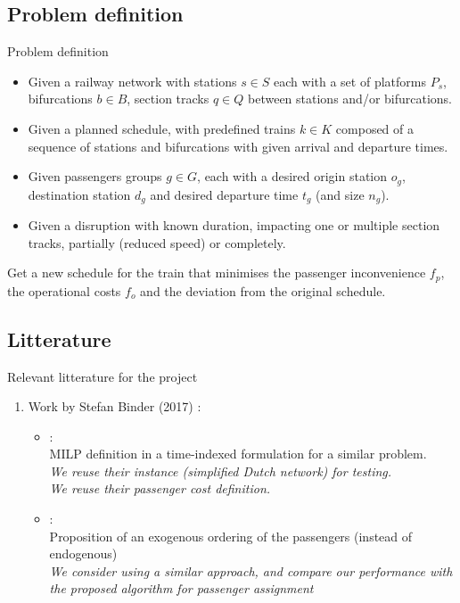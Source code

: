 \documentclass{EESD}
\begin{document}
\subsection{Problem definition}
\begin{frame}{Problem definition}
		
	\begin{itemize}
		\item Given a railway network with stations $s \in S$ each with a set of platforms $P_s$, bifurcations $b \in B$, section tracks $q \in Q$ between stations and/or bifurcations.
		\item Given a planned schedule, with predefined trains $k \in K$ composed of a sequence of stations and bifurcations with given arrival and departure times.
		\item Given passengers groups $g \in G$, each with a desired origin station $o_g$, destination station $d_g$ and desired departure time $t_g$ (and size $n_g$).
		\item Given a disruption with known duration, impacting one or multiple section tracks, partially (reduced speed) or completely.
	\end{itemize}

	Get a new schedule for the train that minimises the passenger inconvenience $f_p$, the operational costs $f_o$ and the deviation from the original schedule.
\end{frame}


\subsection{Litterature}
\begin{frame}{Relevant litterature for the project}
	\begin{enumerate}
		\item Work by Stefan Binder (2017) : \begin{itemize}
			\item \textbf{\cite{BINDER_main}} : \\
				MILP definition in a time-indexed formulation for a similar problem. \\
				{\it We reuse their instance (simplified Dutch network) for testing.\\
				We reuse their passenger cost definition.}
			\item \textbf{\cite{BINDER_priority}} : \\
				Proposition of an exogenous ordering of the passengers (instead of endogenous) \\
				{\it We consider using a similar approach, and compare our performance with the proposed algorithm for passenger assignment}
		\end{itemize}
	\end{enumerate}
\end{frame}
\end{document}
